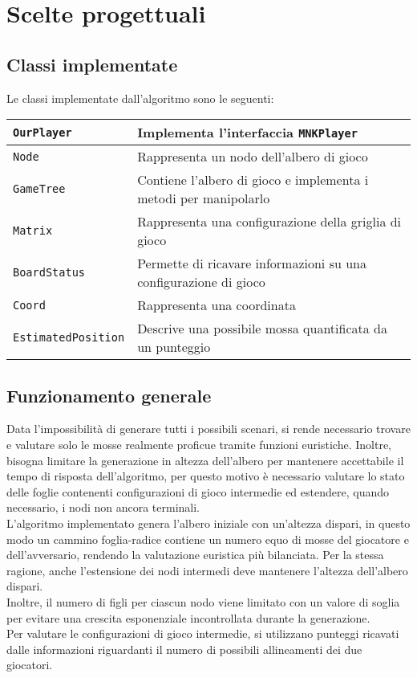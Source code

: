 \documentclass[11pt]{article}
\begin{document}
\section*{Scelte progettuali}
\subsection*{Classi implementate}
Le classi implementate dall'algoritmo sono le seguenti:
\begin{table}[H]	%
\centering			%
\def\arraystretch{1.5}
\begin{tabular}{|l|p{4in}|}	%
\hline	%
\texttt{OurPlayer} & Implementa l'interfaccia \texttt{MNKPlayer} \\ \hline
\texttt{Node} & Rappresenta un nodo dell'albero di gioco \\ \hline
\texttt{GameTree} & Contiene l'albero di gioco e implementa i metodi per manipolarlo \\ \hline
\texttt{Matrix} & Rappresenta una configurazione della griglia di gioco \\ \hline
\texttt{BoardStatus} & Permette di ricavare informazioni su una configurazione di gioco \\ \hline
\texttt{Coord} & Rappresenta una coordinata \\ \hline
\texttt{EstimatedPosition} & Descrive una possibile mossa quantificata da un punteggio \\ \hline
\end{tabular}
\end{table}

\subsection*{Funzionamento generale}
Data l'impossibilità di generare tutti i possibili scenari, si rende necessario trovare e valutare solo le mosse realmente proficue tramite funzioni euristiche. Inoltre, bisogna limitare la generazione in altezza dell'albero per mantenere accettabile il tempo di risposta dell'algoritmo, per questo motivo è necessario valutare lo stato delle foglie contenenti configurazioni di gioco intermedie ed estendere, quando necessario, i nodi non ancora terminali.\\
L'algoritmo implementato genera l'albero iniziale con un'altezza dispari, in questo modo un cammino foglia-radice contiene un numero equo di mosse del giocatore e dell'avversario, rendendo la valutazione euristica più bilanciata.
Per la stessa ragione, anche l'estensione dei nodi intermedi deve mantenere l'altezza dell'albero dispari.\\
Inoltre, il numero di figli per ciascun nodo viene limitato con un valore di soglia per evitare una crescita esponenziale incontrollata durante la generazione.\\
Per valutare le configurazioni di gioco intermedie, si utilizzano punteggi ricavati dalle informazioni riguardanti il numero di possibili allineamenti dei due giocatori.
\end{document}
